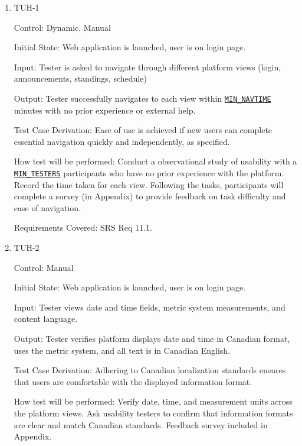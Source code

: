 \documentclass[12pt, titlepage]{article}
\begin{document}
\begin{enumerate}

    \item{TUH-1\\}

          Control: Dynamic, Manual

          Initial State:  Web application is launched, user is on login page.

          Input: Tester is asked to navigate through different platform views (login, announcements, standings, schedule)

          Output: Tester successfully navigates to each view within \hyperref[MIN_NAVTIME]{\texttt{MIN\_NAVTIME}} minutes with no prior experience or external help.

          Test Case Derivation: Ease of use is achieved if new users can complete essential navigation quickly and independently, as specified.

          How test will be performed: Conduct a observational study of usability with a \hyperref[MIN_TESTERS]{\texttt{MIN\_TESTERS}} participants who have no prior experience with the platform. Record the time taken for each view. Following the tasks, participants will complete a survey (in Appendix) to provide feedback on task difficulty and ease of navigation.

          Requirements Covered: SRS Req 11.1.

    \item{TUH-2\\}

          Control: Manual

          Initial State:  Web application is launched, user is on login page.

          Input: Tester views date and time fields, metric system measurements, and content language.

          Output: Tester verifies platform displays date and time in Canadian format, uses the metric system, and all text is in Canadian English.

          Test Case Derivation: Adhering to Canadian localization standards ensures that users are comfortable with the displayed information format.

          How test will be performed: Verify date, time, and measurement units across the platform views. Ask usability testers to confirm that information formats are clear and match Canadian standards. Feedback survey included in Appendix.


\end{enumerate}
\end{document}
